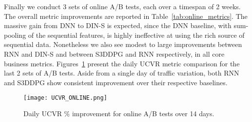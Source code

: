 Finally we conduct 3 sets of online A/B tests, each over a timespan of 2 weeks. The overall metric improvements are reported in Table~\ref{tab:online_metrics}. The massive gain from DNN to DIN-S is expected, since the DNN baseline, with sum-pooling of the sequential features, is highly ineffective at using the rich source of sequential data. Nonetheless we also see modest to large improvements between RNN and DIN-S and between S3DDPG and RNN respectively, in all core business metrics. Figures~\ref{fig:daily_ucvr} present the daily UCVR metric comparison for the last 2 sets of A/B tests.  Aside from a single day of traffic variation, both RNN and S3DDPG show consistent improvement over their respective baselines. 
\begin{figure}
    \centering
    \texttt{[image: UCVR\_ONLINE.png]}
    \caption{Daily UCVR \% improvement for online A/B tests over 14 days.}
    \label{fig:daily_ucvr}
\end{figure}


